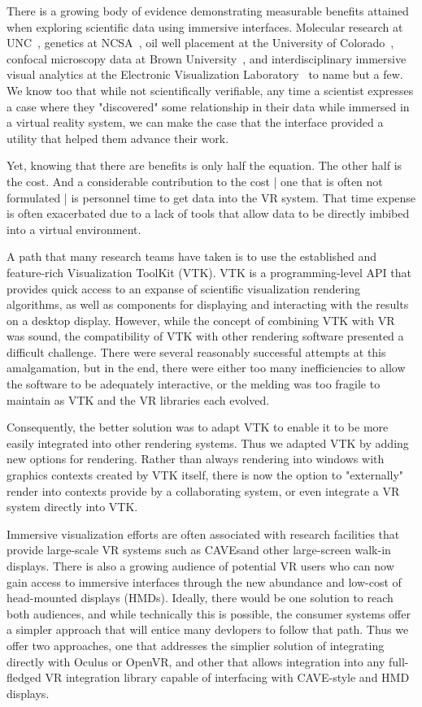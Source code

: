 
There is a growing body of evidence demonstrating measurable benefits
attained when exploring scientific data using immersive interfaces.
Molecular research at UNC~\cite{Brooks:1990},
genetics at NCSA~\cite{Brady:1995},
oil well placement at the University of Colorado~\cite{Gruchalla:2004},  confocal microscopy data at Brown University~\cite{Prabhat:2008}, and interdisciplinary immersive visual analytics at the Electronic Visualization Laboratory~\cite{Marai:2016} to name but a few.
We know too that while not scientifically verifiable, any time a scientist
expresses a case where they "discovered" some relationship in their data
while immersed in a virtual reality system, we can make the case that the
interface provided a utility that helped them advance their work.

Yet, knowing that there are benefits is only half the equation.
The other half is the cost.
And a considerable contribution to the cost | one that is often not
formulated | is personnel time to get data into the VR system.
That time expense is often exacerbated due to a lack of tools that
allow data to be directly imbibed into a virtual environment.

A path that many research teams have taken is to use the established and
feature-rich Visualization ToolKit (VTK).
VTK is a programming-level API that provides quick access to an expanse
of scientific visualization rendering algorithms, as well as components
for displaying and interacting with the results on a desktop display.
However, while the concept of combining VTK with VR was sound, the
compatibility of VTK with other rendering software presented a difficult
challenge.  
There were several reasonably successful attempts at this amalgamation,
but in the end, there were either too many inefficiencies to allow the
software to be adequately interactive, or the melding was too fragile to
maintain as VTK and the VR libraries each evolved.

Consequently, the better solution was to adapt VTK to enable it to be
more easily integrated into other rendering systems.
Thus we adapted VTK by adding new options for rendering.
Rather than always rendering into windows with graphics contexts
created by VTK itself, there is now the option to "externally" render
into contexts provide by a collaborating system, or even integrate a
VR system directly into VTK.


Immersive visualization efforts are often associated with research
facilities that provide large-scale VR systems such as CAVEs\texttrademark and
other large-screen walk-in displays.
There is also a growing audience of potential VR users who can now
gain access to immersive interfaces through the new abundance and low-cost
of head-mounted displays (HMDs).
Ideally, there would be one solution to reach both audiences, and while
technically this is possible, the consumer systems offer a simpler
approach that will entice many devlopers to follow that path.
Thus we offer two approaches, one that addresses the simplier solution
of integrating directly with Oculus or OpenVR, and other that allows integration
into any full-fledged VR integration library capable of interfacing
with CAVE-style and HMD displays.


